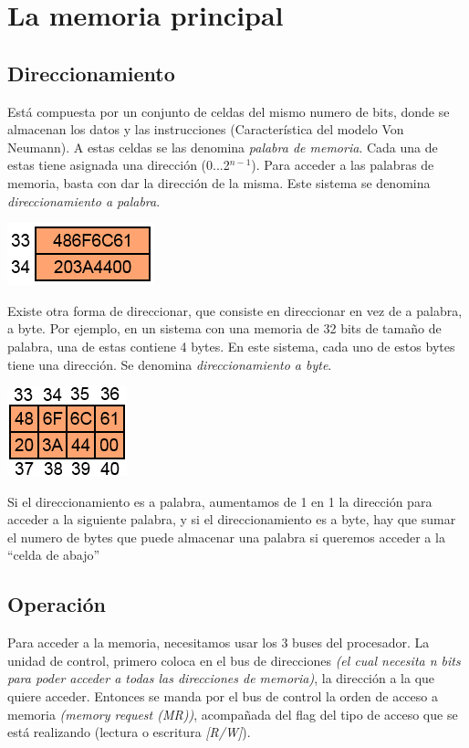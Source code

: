 \documentclass[a4paper,11pt,spanish]{report}
\begin{document}
\section{La memoria principal}
\subsection{Direccionamiento}
Está compuesta por un conjunto de celdas del mismo numero de bits, donde se almacenan los datos y las instrucciones (Característica del modelo Von Neumann). 
A estas celdas se las denomina \emph{palabra de memoria}. 
Cada una de estas tiene asignada una dirección (0...2$^{n-1}$).
Para acceder a las palabras de memoria, basta con dar la dirección de la misma. Este sistema se denomina \emph{direccionamiento a palabra}.
\begin{center}
\includegraphics{res/tema1/memoriapalabra.png}
\end{center}
Existe otra forma de direccionar, que consiste en direccionar en vez de a palabra, a byte. Por ejemplo, en un sistema con una memoria de 32 bits de tamaño de palabra, una de estas contiene 4 bytes. En este sistema, cada uno de estos bytes tiene una dirección. Se denomina  \emph{direccionamiento a byte}.

\begin{center}
\includegraphics{res/tema1/memoriabyte.png}
\end{center}

Si el direccionamiento es a palabra, aumentamos de 1 en 1 la dirección para acceder a la siguiente palabra, y si el direccionamiento es a byte, hay que sumar el numero de bytes que puede almacenar una palabra si queremos acceder a la \textquotedblleft celda de abajo\textquotedblright
\subsection{Operación}
Para acceder a la memoria, necesitamos usar los 3 buses del procesador. La unidad de control, primero coloca en el bus de direcciones \emph{(el cual necesita n bits para poder acceder a  todas las direcciones de memoria)}, la dirección a la que quiere acceder. Entonces se manda por el bus de control la orden de acceso a memoria \emph{(memory request (MR))}, acompañada del flag del tipo de acceso que se está realizando (lectura o escritura \emph{[R/W]}).
\end{document}
